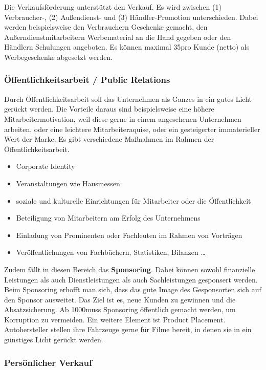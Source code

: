 {Die Verkaufsförderung unterstützt den Verkauf. Es wird zwischen (1) Verbraucher-, (2) Außendienst- und (3) Händler-Promotion unterschieden. Dabei werden beispielsweise den Verbrauchern Geschenke gemacht, den Außerndienstmitarbeitern Werbematerial an die Hand gegeben oder den Händlern Schulungen angeboten. Es können maximal 35\Euro pro Kunde (netto) als Werbegeschenke abgesetzt werden.

\subsubsection{Öffentlichkeitsarbeit / Public Relations}

Durch Öffentlichkeitsarbeit soll das Unternehmen als Ganzes in ein gutes Licht gerückt werden. Die Vorteile daraus sind beispielsweise eine höhere Mitarbeitermotivation, weil diese gerne in einem angesehenen Unternehmen arbeiten, oder eine leichtere Mitarbeiteraquise,  oder ein gesteigerter immaterieller Wert der Marke. Es gibt verschiedene Maßnahmen im Rahmen der Öffentlichkeitsarbeit.
\begin{itemize}
	\item Corporate Identity
	\item Veranstaltungen wie Hausmessen
	\item soziale und kulturelle Einrichtungen für Mitarbeiter oder die Öffentlichkeit
	\item Beteiligung von Mitarbeitern am Erfolg des Unternehmens
	\item Einladung von Prominenten oder Fachleuten im Rahmen von Vorträgen
	\item Veröffentlichungen von Fachbüchern, Statistiken, Bilanzen \dots
\end{itemize}

Zudem fällt in diesen Bereich das {\bf Sponsoring}. Dabei können sowohl finanzielle Leistungen als auch Dienstleistungen als auch Sachleistungen gesponsert werden. Beim Sponsoring erhofft man sich, dass das gute Image des Gesponsorten sich auf den Sponsor ausweitet. Das Ziel ist es, neue Kunden zu gewinnen und die Absatzsicherung. Ab 1000\Euro muss Sponsoring öffentlich gemacht werden, um Korruption zu vermeiden. Ein weitere Element ist Product Placement. Autohersteller stellen ihre Fahrzeuge gerne für Filme bereit, in denen sie in ein günstiges Licht gerückt werden.

\subsubsection{Persönlicher Verkauf}


}
